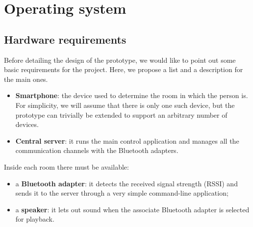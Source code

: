 \documentclass[conference]{IEEEtran}
\begin{document}

\section{Operating system}

\subsection{Hardware requirements}
\label{hardware-requirements}
Before detailing the design of the prototype, we would like to point out some basic requirements for the project. Here, we propose a list and a description for the main ones.
\begin{itemize}
	\item{\textbf{Smartphone}:} the device used to determine the room in which the person is. For simplicity, we will assume that there is only one such device, but the prototype can trivially be extended to support an arbitrary number of devices.
	\item{\textbf{Central server}:} it runs the main control application and manages all the communication channels with the Bluetooth adapters.
\end{itemize}
Inside each room there must be available:
\begin{itemize}
	\item{a \textbf{Bluetooth adapter}:} it detects the received signal strength (RSSI) and sends it to the server through a very simple command-line application;
	\item{a \textbf{speaker}:} it lets out sound when the associate Bluetooth adapter is selected for playback.
\end{itemize}
\end{document}
